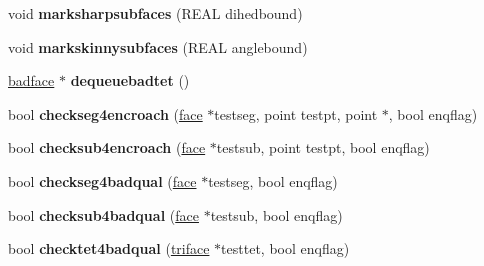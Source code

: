 \begin{DoxyCompactItemize}
\item 
\mbox{\label{classStemMesh3D_1_1tetgenmesh_aabc5a1b17630e0a68cd684c469ac6c6d}} 
void {\bfseries marksharpsubfaces} (R\+E\+AL dihedbound)
\item 
\mbox{\label{classStemMesh3D_1_1tetgenmesh_a5a7aecaa7ecb644538f6fdb2f396123d}} 
void {\bfseries markskinnysubfaces} (R\+E\+AL anglebound)
\item 
\mbox{\label{classStemMesh3D_1_1tetgenmesh_a01a718156d32ca1b92ae99d6a4a9280e}} 
\hyperlink{structStemMesh3D_1_1tetgenmesh_1_1badface}{badface} $\ast$ {\bfseries dequeuebadtet} ()
\item 
\mbox{\label{classStemMesh3D_1_1tetgenmesh_a485449b13857dbdf66602a998b275bc3}} 
bool {\bfseries checkseg4encroach} (\hyperlink{classStemMesh3D_1_1tetgenmesh_1_1face}{face} $\ast$testseg, point testpt, point $\ast$, bool enqflag)
\item 
\mbox{\label{classStemMesh3D_1_1tetgenmesh_a3f21915ff222d971cd6f89a77cb76fed}} 
bool {\bfseries checksub4encroach} (\hyperlink{classStemMesh3D_1_1tetgenmesh_1_1face}{face} $\ast$testsub, point testpt, bool enqflag)
\item 
\mbox{\label{classStemMesh3D_1_1tetgenmesh_ab5d1c40ea5fa22276843b0e55670031d}} 
bool {\bfseries checkseg4badqual} (\hyperlink{classStemMesh3D_1_1tetgenmesh_1_1face}{face} $\ast$testseg, bool enqflag)
\item 
\mbox{\label{classStemMesh3D_1_1tetgenmesh_a7f4c3c7380a43a782815b325935ae36b}} 
bool {\bfseries checksub4badqual} (\hyperlink{classStemMesh3D_1_1tetgenmesh_1_1face}{face} $\ast$testsub, bool enqflag)
\item 
\mbox{\label{classStemMesh3D_1_1tetgenmesh_a63ab13f3b4bc4d20bcdfa8430713f997}} 
bool {\bfseries checktet4badqual} (\hyperlink{classStemMesh3D_1_1tetgenmesh_1_1triface}{triface} $\ast$testtet, bool enqflag)
\item 
\mbox{\label{classStemMesh3D_1_1tetgenmesh_a436536bbde1dad6a9d8069ea32025b85}} 

\end{DoxyCompactItemize}

